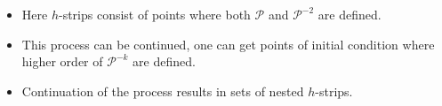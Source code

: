 \documentclass [10pt] {beamer}
\begin{document}
\begin{frame}
\begin{columns}[T]
\begin{column}{.5\textwidth}
\begin{itemize}
				\item Here $h$-strips consist of points where both $\mathcal{P}$ and $\mathcal{P}^{-2}$ are defined.\\[10pt]
				\item This process can be continued, one can get points of initial condition where higher order of $\mathcal{P}^{-k}$ are defined.\\[10pt]
				\item Continuation of the process results in sets of nested $h$-strips.\\[10pt]
			\end{itemize}
		\end{column}
	\end{columns}
\end{frame}

\end{document}
